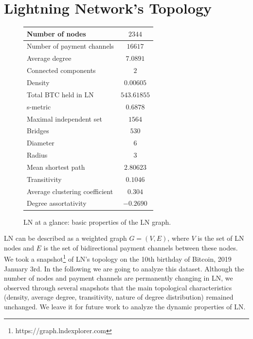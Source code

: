\documentclass[runningheads]{llncs}
\def\bitcoinA{%
	\leavevmode
	\vtop{\offinterlineskip %
		\setbox0=\hbox{B}%
		\setbox2=\hbox to\wd0{\hfil\hskip-.03em
			\vrule height .3ex width .15ex\hskip .08em
			\vrule height .3ex width .15ex\hfil}
		\vbox{\copy2\box0}\box2}}
\begin{document}
\section{Lightning Network's Topology}\label{lntopology}
\begin{figure}
	\begin{tabular}{| l | c |}
		\hline
		Number of nodes & $2344$  \\ \hline
		Number of payment channels & $16617$  \\ \hline
		Average degree & $7.0891$ \\ \hline
		Connected components & $2$  \\ \hline
		Density & $0.00605$ \\ \hline
		Total BTC held in LN & $543.61855$\bitcoinA\\ \hline
		s-metric& $0.6878$ \\ \hline
		Maximal independent set & $1564$ \\ \hline
		Bridges & $530$ \\ \hline
		Diameter & $6$ \\ \hline
		Radius & $3$ \\ \hline
		Mean shortest path &  $2.80623$ \\ \hline
		Transitivity& $0.1046$\\ \hline
		Average clustering coefficient&$0.304$ \\ \hline
		Degree assortativity& $-0.2690$ \\ \hline
	\end{tabular}
	\caption{LN at a glance: basic properties of the LN graph.}\label{fig:properties}
\end{figure}

LN can be described as a weighted graph $G=(V,E)$, where $V$ is the set of LN nodes and $E$ is the set of bidirectional payment channels between these nodes. We took a snapshot\footnote{https://graph.lndexplorer.com} of LN's topology on the 10th birthday of Bitcoin, 2019 January 3rd. In the following we are going to analyze this dataset. Although the number of nodes and payment channels are permanently changing in LN, we observed through several snapshots that the main topological characteristics (density, average degree, transitivity, nature of degree distribution) remained unchanged. We leave it for future work to analyze the dynamic properties of LN.
\end{document}
